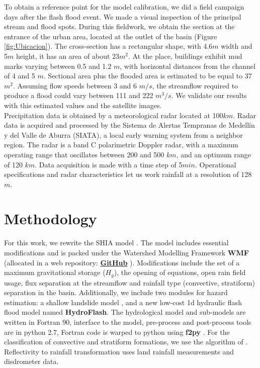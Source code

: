 {To obtain a reference point for the model calibration, we did a field campaign days after the flash flood event.  We made a visual inspection of the principal stream and flood spots. During this fieldwork, we obtain the section at the entrance of the urban area, located at the outlet of the basin (Figure \ref{fig:Ubicacion}).  The cross-section has a rectangular shape, with 4.6$m$ width and 5$m$ height, it has an area of about 23$m^2$.  At the place, buildings exhibit mud marks varying between 0.5 and 1.2 $m$, with horizontal distances from the channel of 4 and 5 $m$.  Sectional area plus the flooded area is estimated to be equal to 37$m^2$.  Assuming flow speeds between 3 and 6 $m/s$, the streamflow required to produce a flood could vary between 111 and 222 $m^3/s$.  We validate our results with this estimated values and the satellite images.\\ 

Precipitation data is obtained by a meteorological radar located at 100$km$.  Radar data is acquired and processed by the Sistema de Alertas Tempranas de Medellín y del Valle de Aburra (SIATA), a local early warning system from a neighbor region.  The radar is a band C polarimetric Doppler radar,  with a maximum operating range that oscillates between 200 and 500 $km$, and an optimum range of 120 $km$.  Data acquisition is made with a time step of 5$min$.  Operational specifications and radar characteristics let us work rainfall at a resolution of 128 $m$.  \\

\section{Methodology}

For this work, we rewrite the SHIA model \citep{Frances2007b}.   The model includes essential modifications and is packed under the Watershed Modelling Framework \textbf{WMF} (allocated in a web repository: \href{https://github.com/nicolas998/WMF.git}{\textbf{GitHub}} ).  Modifications include the set of a maximum gravitational storage ($H_{g}$), the opening of equations, open rain field usage, flux separation at the streamflow and rainfall type (convective, stratiform) separation in the basin.  Additionally, we include two modules for hazard estimation: a shallow landslide model \citep{Aristizabal2016}, and a new low-cost 1d hydraulic flash flood model named \textbf{HydroFlash}.  The hydrological model and sub-models are written in Fortran 90, interface to the model, pre-process and post-process tools are in python 2.7, Fortran code is warped to python using \textbf{f2py} \citep{Peterson2009}.  For the classification of convective and stratiform formations, we use the algorithm of \citet{Steiner1995}. Reflectivity to rainfall transformation uses land rainfall measurements and disdrometer data.\\  

}
